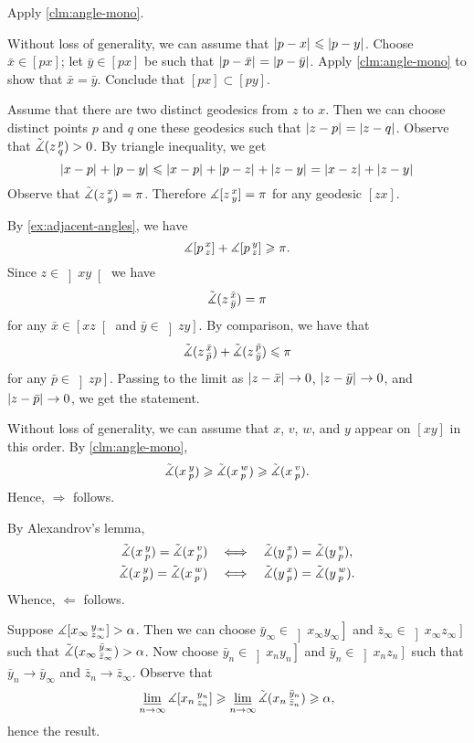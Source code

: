 Apply \ref{clm:angle-mono}.

Without loss of generality, we can assume that $\dist{p}{x}{}\le \dist{p}{y}{}$.
Choose $\bar x\in [px]$;
let $\bar y\in [px]$ be such that $\dist{p}{\bar x}{}=\dist{p}{\bar y}{}$.
Apply \ref{clm:angle-mono} to show that $\bar x=\bar y$.
Conclude that $[px]\subset [py]$.

Assume that there are two distinct geodesics from $z$ to $x$.
Then we can choose distinct points $p$ and $q$ one these geodesics such that $\dist{z}{p}{}=\dist{z}{q}{}$.
Observe that $\tilde\measuredangle(z\,{}^{p}_{q})>0$.
By triangle inequality, we get 
\[\dist{x}{p}{}+\dist{p}{y}{}\le \dist{x}{p}{}+\dist{p}{z}{}+\dist{z}{y}{}=\dist{x}{z}{}+\dist{z}{y}{}\]
Observe that $\tilde\measuredangle(z\,{}^{x}_{y})=\pi$.
Therefore $\measuredangle[z\,{}^{x}_{y}]=\pi$ for any geodesic $[zx]$.

By \ref{ex:adjacent-angles}, we have
\[\measuredangle[p\,{}^{x}_{z}]+\measuredangle[p\,{}^{y}_{z}]\geqslant \pi.\]
Since $z\in \left]xy\right[$ we have 
\[\tilde\measuredangle(z\,{}^{\bar x}_{\bar y})=\pi\]
for any $\bar x\in \left[xz\right[$ and $\bar y\in \left]zy\right]$.
By comparison, we have that 
\[\tilde\measuredangle(z\,{}^{\bar x}_{\bar p})+\tilde\measuredangle(z\,{}^{\bar p}_{\bar y})\leqslant\pi\]
for any $\bar p\in \left]zp\right]$.
Passing to the limit as
$\dist{z}{\bar x}{}\to 0$,
$\dist{z}{\bar y}{}\to 0$, and
$\dist{z}{\bar p}{}\to 0$,
we get the statement.

Without loss of generality, we can assume that $x$, $v$, $w$, and $y$ appear on 
$[xy]$ in this order.
By \ref{clm:angle-mono},
\[
\tilde\measuredangle(x\,{}^{y}_{p})\geqslant \tilde\measuredangle(x\,{}^{w}_{p}) \geqslant\tilde\measuredangle(x\,{}^{v}_{p}).
\]
Hence, $\Rightarrow$ follows.

By Alexandrov's lemma,
\begin{align*}
\tilde\measuredangle(x\,{}^{y}_{p})=\tilde\measuredangle(x\,{}^{v}_{p})
\quad&\Longleftrightarrow\quad
\tilde\measuredangle(y\,{}^{x}_{p})=\tilde\measuredangle(y\,{}^{v}_{p}),
\\
\tilde\measuredangle(x\,{}^{y}_{p})=\tilde\measuredangle(x\,{}^{w}_{p})
\quad&\Longleftrightarrow\quad
\tilde\measuredangle(y\,{}^{x}_{p})=\tilde\measuredangle(y\,{}^{w}_{p}).
\end{align*}
Whence, $\Leftarrow$ follows.

 Suppose $\measuredangle [x_\infty\,{}^{y_\infty}_{z_\infty}]>\alpha$.
Then we can choose $\bar y_\infty\in\left]x_\infty y_\infty\right]$
and $\bar z_\infty\in\left]x_\infty z_\infty\right]$ such that 
$\tilde\measuredangle(x_\infty\,{}^{\bar y_\infty}_{\bar z_\infty})>\alpha$.
Now choose $\bar y_n\in\left]x_n y_n\right]$ and $\bar y_n\in\left]x_n z_n\right]$ such that $\bar y_n\to \bar y_\infty$ and $\bar z_n\to \bar z_\infty$.
Observe that 
\[\varliminf_{n\to\infty}\measuredangle [x_n\,{}^{y_n}_{z_n}]\geqslant\varliminf_{n\to\infty}\tilde\measuredangle(x_n\,{}^{\bar y_n}_{\bar z_n}) \geqslant \alpha,\]
hence the result.


